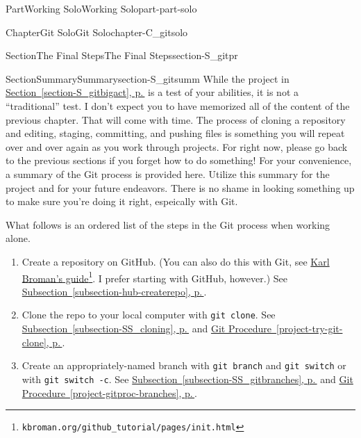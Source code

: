 \documentclass[twoside,10pt,]{book}
\newcommand{\xreffont}{\relax}
\newcommand{\mono}[1]{\texttt{#1}}
\begin{document}
\begin{partptx}{Part}{Working Solo}{}{Working Solo}{}{}{part-part-solo}
\begin{chapterptx}{Chapter}{Git Solo}{}{Git Solo}{}{}{chapter-C_gitsolo}
\begin{sectionptx}{Section}{The Final Steps}{}{The Final Steps}{}{}{section-S_gitpr}
\end{sectionptx}
%
%
\typeout{************************************************}
\typeout{************************************************}
%
\begin{sectionptx}{Section}{Summary}{}{Summary}{}{}{section-S_gitsumm}
%
While the project in \hyperref[section-S_gitbigact]{Section~{\xreffont\ref{section-S_gitbigact}}, p.\,\pageref{section-S_gitbigact}} is a test of your abilities, it is not a ``traditional'' test. I don't expect you to have memorized all of the content of the previous chapter. That will come with time. The process of cloning a repository and editing, staging, committing, and pushing files is something you will repeat over and over again as you work through projects. For right now, please go back to the previous sections if you forget how to do something! For your convenience, a summary of the Git process is provided here. Utilize this summary for the project and for your future endeavors. There is no shame in looking something up to make sure you're doing it right, espeically with Git.%
\par
What follows is an ordered list of the steps in the Git process when working alone.%
\begin{enumerate}
\item{}Create a repository on GitHub. (You can also do this with Git, see \href{https://kbroman.org/github_tutorial/pages/init.html}{Karl Broman's guide}\footnote{\nolinkurl{kbroman.org/github_tutorial/pages/init.html}\label{fn-S_gitsumm-d-a-a-a-b}}. I prefer starting with GitHub, however.) See \hyperref[subsection-hub-createrepo]{Subsection~{\xreffont\ref{subsection-hub-createrepo}}, p.\,\pageref{subsection-hub-createrepo}}.%
\item{}Clone the repo to your local computer with \mono{git clone}. See \hyperref[subsection-SS_cloning]{Subsection~{\xreffont\ref{subsection-SS_cloning}}, p.\,\pageref{subsection-SS_cloning}} and \hyperref[project-try-git-clone]{Git Procedure~{\xreffont\ref{project-try-git-clone}}, p.\,\pageref{project-try-git-clone}}.%
\item{}Create an appropriately-named branch with \mono{git branch} and \mono{git switch} or with \mono{git switch -c}. See \hyperref[subsection-SS_gitbranches]{Subsection~{\xreffont\ref{subsection-SS_gitbranches}}, p.\,\pageref{subsection-SS_gitbranches}} and \hyperref[project-gitproc-branches]{Git Procedure~{\xreffont\ref{project-gitproc-branches}}, p.\,\pageref{project-gitproc-branches}}.%

\end{enumerate}
\end{sectionptx}
\end{chapterptx}
\end{partptx}
\end{document}
